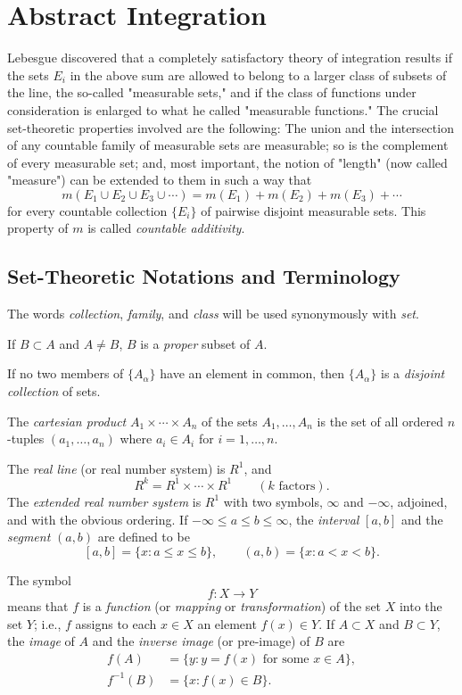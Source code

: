 \documentclass[a4paper,12pt,twoside,openany]{book}
\begin{document}
\chapter{Abstract Integration}

Lebesgue discovered that a completely satisfactory theory of integration results if the sets $E_i$ in the above sum are allowed to belong to a larger class of subsets of the line, the so-called "measurable sets," and if the class of functions under consideration is enlarged to what he called "measurable functions." The crucial set-theoretic properties involved are the following: The union and the intersection of any countable family of measurable sets are measurable; so is the complement of every measurable set; and, most important, the notion of "length" (now called "measure") can be extended to them in such a way that $$m(E_1\cup E_2\cup E_3\cup\cdots)=m(E_1)+m(E_2)+m(E_3)+\cdots$$ for every countable collection $\{E_i\}$ of pairwise disjoint measurable sets. This property of $m$ is called \textit{countable additivity}.

\section{Set-Theoretic Notations and Terminology}

The words \textit{collection}, \textit{family}, and \textit{class} will be used synonymously with \textit{set}.

If $B\subset A$ and $A\ne B$, $B$ is a \textit{proper} subset of $A$.

If no two members of $\{A_{\alpha}\}$ have an element in common, then $\{A_{\alpha}\}$ is a \textit{disjoint collection} of sets.

The \textit{cartesian product} $A_1\times\cdots\times A_n$ of the sets $A_1,\ldots,A_n$ is the set of all ordered $n$-tuples $(a_1,\ldots,a_n)$ where $a_i\in A_i$ for $i=1,\ldots,n$.

The \textit{real line} (or real number system) is $R^1$, and $$R^k=R^1\times\cdots\times R^1\qquad(k\text{ factors}).$$ The \textit{extended real number system} is $R^1$ with two symbols, $\infty$ and $-\infty$, adjoined, and with the obvious ordering. If $-\infty\le a\le b\le\infty$, the \textit{interval} $[a,b]$ and the \textit{segment} $(a,b)$ are defined to be $$[a,b]=\{x:a\le x\le b\},\qquad(a,b)=\{x:a<x<b\}.$$

The symbol $$f:X\to Y$$ means that $f$ is a \textit{function} (or \textit{mapping} or \textit{transformation}) of the set $X$ into the set $Y$; i.e., $f$ assigns to each $x\in X$ an element $f(x)\in Y$. If $A\subset X$ and $B\subset Y$, the \textit{image} of $A$ and the \textit{inverse image} (or pre-image) of $B$ are $$\begin{aligned}f(A)&=\{y:y=f(x)\text{ for some }x\in A\},\\f^{-1}(B)&=\{x:f(x)\in B\}.\end{aligned}$$
\end{document}
